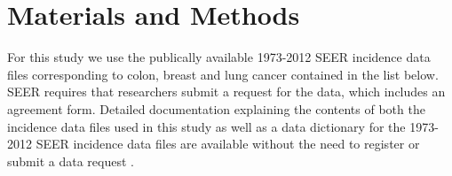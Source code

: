 \documentclass[10pt,letterpaper]{article}
\begin{document}



\section*{Materials and Methods}
\label{sec:materialsandmethods}
For this study we use the publically available 1973-2012 SEER incidence data files corresponding to colon, breast and lung cancer contained in the list below.
SEER requires that researchers submit a request for the data, which includes an agreement form. Detailed documentation explaining the contents of both the incidence data files used in this study as well as a data dictionary for the 1973-2012 SEER incidence data files are available without the need to register or submit a data request \cite{seerdoc}.
 
\end{document}
